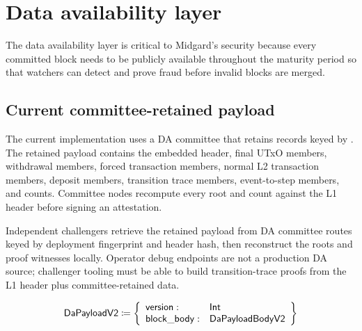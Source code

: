 \documentclass[../midgard.tex]{subfiles}
\begin{document}
\section{Data availability layer}
\label{h:data-availability-layer}

The data availability layer is critical to Midgard's security because every committed block needs to be publicly available throughout the maturity period so that watchers can detect and prove fraud before invalid blocks are merged.

\subsection{Current committee-retained payload}
\label{h:data-availability-current-committee}

The current implementation uses a DA committee that retains  records keyed by .
The retained payload contains the embedded header, final UTxO members, withdrawal members, forced transaction members, normal L2 transaction members, deposit members, transition trace members, event-to-step members, and counts.
Committee nodes recompute every root and count against the L1 header before signing an attestation.

Independent challengers retrieve the retained payload from DA committee routes keyed by deployment fingerprint and header hash, then reconstruct the roots and proof witnesses locally.
Operator debug endpoints are not a production DA source; challenger tooling must be able to build transition-trace proofs from the L1 header plus committee-retained data.

\begin{equation*}
    \mathsf{DaPayloadV2} \coloneq \left\{
    \begin{array}{ll}
        \mathsf{version} : & \mathsf{Int} \\
        \mathsf{block\_body} : & \mathsf{DaPayloadBodyV2}
    \end{array} \right\}
\end{equation*}
\end{document}
